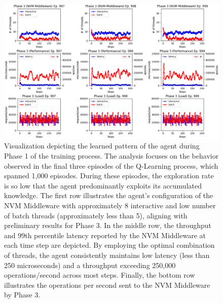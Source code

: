   \begin{figure}[ht]
    \centering
    \includegraphics[width=\textwidth,height=\textheight,keepaspectratio,angle=0]{images/rl_training_phase3.png}
    \caption[Learned Pattern of Agent during Phase 3]{Visualization depicting the learned pattern of the agent during Phase 1 of the training process. The analysis focuses on the behavior observed in the final three episodes of the Q-Learning process, which spanned 1,000 episodes. During these episodes, the exploration rate is so low that the agent predominantly exploits its accumulated knowledge. The first row illustrates the agent's configuration of the NVM Middleware with approximately 8 interactive and low number of batch threads (approximately less than 5), aligning with preliminary results for Phase 3. In the middle row, the throughput and 99th percentile latency reported by the NVM Middleware at each time step are depicted. By employing the optimal combination of threads, the agent consistently maintains low latency (less than 250 microseconds) and a throughput exceeding 250,000 operations/second across most steps. Finally, the bottom row illustrates the operations per second sent to the NVM Middleware by Phase 3.}
    \label{fig:learned_phase_3}
  \end{figure}

